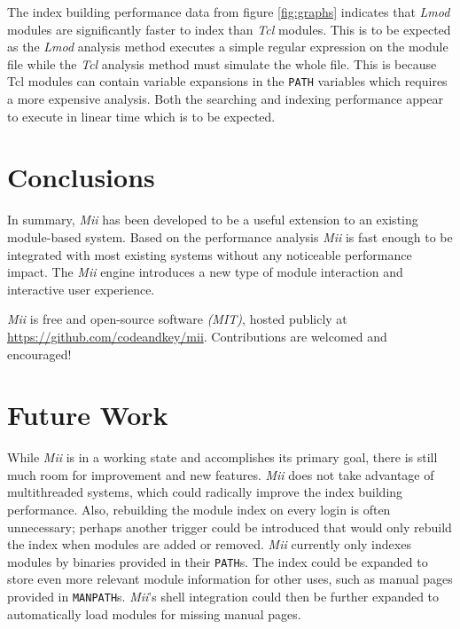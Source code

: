 \documentclass[manuscript,screen]{acmart}
\begin{document}
The index building performance data from figure \ref{fig:graphs} indicates that \textit{Lmod} modules are significantly faster to
index than \textit{Tcl} modules. This is to be expected as the \textit{Lmod} analysis method executes a simple regular
expression on the module file while the \textit{Tcl} analysis method must simulate the whole file. This is because
Tcl modules can contain variable expansions in the \texttt{PATH} variables which requires a more expensive analysis.
Both the searching and indexing performance appear to execute in linear time which is to be expected.

\section{Conclusions}

In summary, \textit{Mii} has been developed to be a useful extension to an existing module-based system. Based
on the performance analysis \textit{Mii} is fast enough to be integrated with most existing systems without any
noticeable performance impact. The \textit{Mii} engine introduces a new type of module interaction and interactive
user experience.

\par

\textit{Mii} is free and open-source software \textit{(MIT)}, hosted publicly at \url{https://github.com/codeandkey/mii}. Contributions are welcomed and encouraged!

\section{Future Work}

While \textit{Mii} is in a working state and accomplishes its primary goal, there is still much room for improvement
and new features. \textit{Mii} does not take advantage of multithreaded systems, which could radically improve the
index building performance. Also, rebuilding the module index on every login is often unnecessary; perhaps
another trigger could be introduced that would only rebuild the index when modules are added or removed.
\textit{Mii} currently only indexes modules by binaries provided in their \texttt{PATH}s. The index could be expanded to
store even more relevant module information for other uses, such as manual pages provided in \texttt{MANPATH}s.
\textit{Mii}’s shell integration could then be further expanded to automatically load modules for missing manual
pages.

\par
\end{document}
